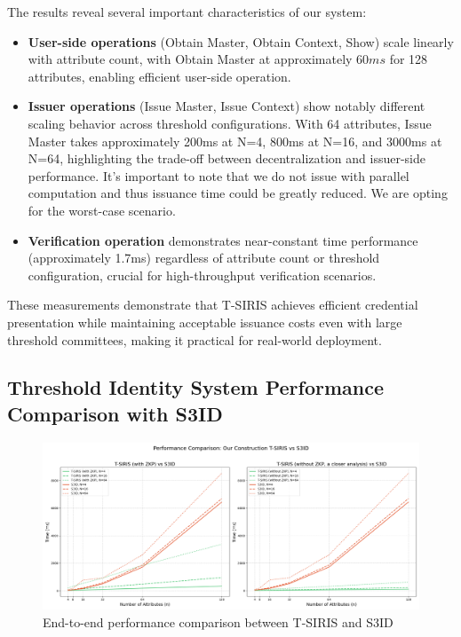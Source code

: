 The results reveal several important characteristics of our system:

\begin{itemize}
    \item \textbf{User-side operations} (Obtain Master, Obtain Context, Show) scale linearly with attribute count, with Obtain Master at approximately $60ms$ for 128 attributes, enabling efficient user-side operation.
        
    \item \textbf{Issuer operations} (Issue Master, Issue Context) show notably different scaling behavior across threshold configurations. With 64 attributes, Issue Master takes approximately 200ms at N=4, 800ms at N=16, and 3000ms at N=64, highlighting the trade-off between decentralization and issuer-side performance. It's important to note that we do not issue with parallel computation and thus issuance time could be greatly reduced. We are opting for the worst-case scenario.
    
    \item \textbf{Verification operation} demonstrates near-constant time performance (approximately 1.7ms) regardless of attribute count or threshold configuration, crucial for high-throughput verification scenarios.

\end{itemize}

These measurements demonstrate that T-SIRIS achieves efficient credential presentation while maintaining acceptable issuance costs even with large threshold committees, making it practical for real-world deployment.


\subsection{Threshold Identity System Performance Comparison with S3ID}
 

\begin{figure}[!htb]
    \centering
    \includegraphics[width=\linewidth]{figures/chap5_tsiris_against_s3id.png}
    \caption{End-to-end performance comparison between T-SIRIS and S3ID}
    \label{fig:tsiris-vs-s3id}
\end{figure}



